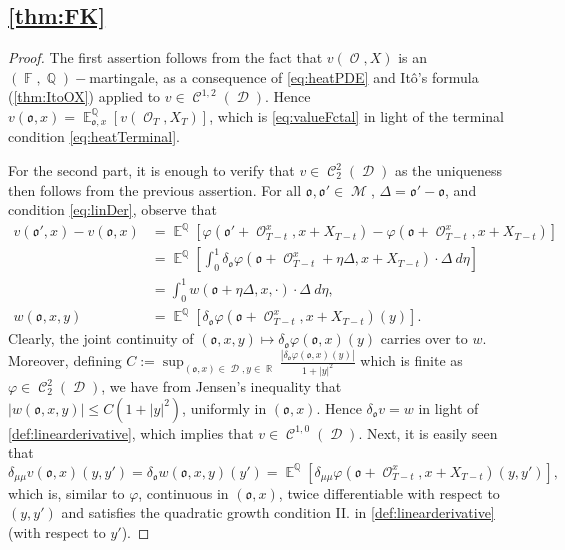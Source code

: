 \documentclass[11pt]{article}
\def\mo{\mathfrak{o}}
\theoremstyle{plain}
\theoremstyle{definition}
\DeclareMathOperator{\E}{\mathbb{E}}
\DeclareMathOperator{\F}{\mathbb{F}}
\DeclareMathOperator{\Q}{\mathbb{Q}}
\DeclareMathOperator{\R}{\mathbb{R}}
\DeclareMathOperator{\calC}{\mathcal{C}}
\DeclareMathOperator{\calD}{\mathcal{D}}
\DeclareMathOperator{\calM}{\mathcal{M}}
\DeclareMathOperator{\calO}{\mathcal{O}}
\begin{document}
    \subsection{\cref{thm:FK}}\label{app:FKBM}
 \begin{proof}
The first assertion follows from   the fact that $v(\calO,X)$ is an $(\F,\Q)-$martingale, as a consequence of \eqref{eq:heatPDE} and Itô's formula (\cref{thm:ItoOX})  applied to $v\in \calC^{1,2}(\calD)$. %
Hence $v(\mo,x) = \E_{\mo,x}^{\Q}[v(\calO_T,X_T)]$, which is \eqref{eq:valueFctal} in light of the terminal condition \eqref{eq:heatTerminal}. 

For the second part, it is enough to  verify that $v \in \calC^{2}_2(\calD)$ as the uniqueness then follows from the previous assertion. For all $\mo,\mo'\in \calM$, $\Delta =\mo'-\mo$, and condition \eqref{eq:linDer}, observe that  
\begin{align*}
    v(\mo',x)-v(\mo,x) &= \E^{\Q}[\varphi(\mo'+\calO_{T-t}^x,x + X_{T-t}) - \varphi(\mo+\calO_{T-t}^x,x + X_{T-t})]\\
   &=  \E^{\Q}\left[ \int_0^1 \delta_\mo\varphi(\mo+\calO_{T-t}^x + \eta \Delta,x + X_{T-t}) \cdot \Delta \ d\eta  \right]\\
        &=  \int_0^1 w(\mo+ \eta \Delta,x,\cdot)  \cdot \Delta \ d\eta, \\[1em]
        w(\mo,x,y) &= \E^{\Q}[\delta_\mo\varphi(\mo+\calO_{T-t}^x ,x + X_{T-t})(y)].
\end{align*}
Clearly, the joint continuity of $(\mo,x,y) \mapsto \delta_\mo\varphi(\mo,x)(y)$ carries over to $w$. Moreover, defining $C := \sup_{(\mo,x)\in \calD, y\in \R}\frac{|\delta_\mo\varphi(\mo ,x)(y)|}{1+|y|^2} $ which is finite as  $ \varphi \in \calC_2^{2}(\calD)$, we have  from Jensen's inequality  that 
$|w(\mo,x,y)| \le C(1+|y|^2)$, uniformly in $(\mo,x)$. 
Hence $\delta_\mo v = w$ in light of \cref{def:linearderivative}, which implies that  $v \in \calC^{1,0}(\calD)$.  Next, it is easily seen that  
$$\delta_{\mu \mu}v(\mo,x)(y,y') = \delta_\mo w(\mo ,x,y)(y') = \E^{\Q}[\delta_{\mu\mu}\varphi(\mo+\calO_{T-t}^x ,x + X_{T-t})(y,y')], $$ 
which is, similar to  $\varphi$,  continuous in $(\mo,x)$,    twice differentiable with respect to $(y,y')$ and satisfies the quadratic growth condition II. in \cref{def:linearderivative} (with respect to $y'$). 


\end{proof}
\end{document}
